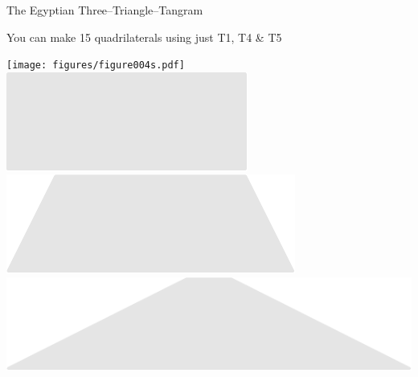 \documentclass[14pt]{beamer}
\begin{document}

    \begin{frame}{The Egyptian Three--Triangle--Tangram}
        \begin{center}
            You can make 15 quadrilaterals using just T1, T4 \& T5

            \bigskip \bigskip

            \texttt{[image: figures/figure004s.pdf]}\quad
            \quad
            \includegraphics[scale=0.240]{figures/figure004b.pdf}\quad
            \includegraphics[scale=0.240]{figures/figure004e.pdf}\quad
            \includegraphics[scale=0.240]{figures/figure004f.pdf}\\

            \bigskip \bigskip


\end{center}
\end{frame}
\end{document}
